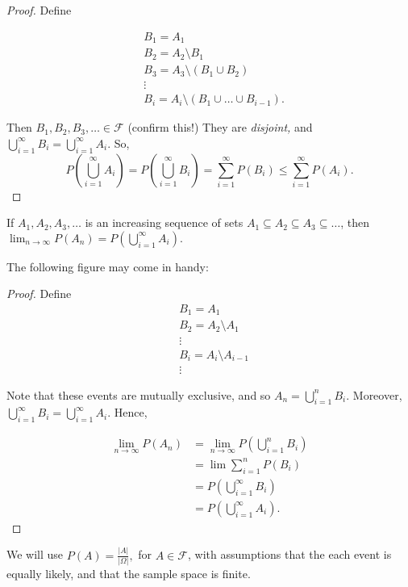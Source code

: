 \begin{proof}
Define 

\begin{align*}
    &B_1=A_1\\
    &B_2= A_2\setminus B_1 \\
    &B_3= A_3 \setminus (B_1\cup B_2) \\
    &\vdots \\
    &B_i=A_i\setminus(B_1\cup \dots \cup B_{i-1}).
\end{align*}

    Then $B_1,B_2,B_3,\dots\in \mathcal F$ (confirm this!) They are \textit{disjoint,} and $\bigcup_{i=1}^\infty B_i=\bigcup^\infty_{i=1}A_i.$ So,
    $$P\left(\bigcup_{i=1}^\infty A_i\right)=P\left(\bigcup_{i=1}^\infty B_i\right)=\sum^\infty_{i=1}P(B_i)\leq \sum^\infty_{i=1}P(A_i).
    $$
\end{proof}
\begin{prop}
		
If $A_1,A_2,A_3,\dots$ is an increasing sequence of sets $A_1\subseteq A_2\subseteq A_3\subseteq \dots$, then $\lim_{n\to \infty} P(A_n)=P\left(\bigcup_{i=1}^\infty A_i\right).$ 
\end{prop}
The following figure may come in handy:
\begin{proof}
Define
\begin{align*}
    &B_1=A_1 \\
    &B_2=A_2\setminus A_1 \\
    &\vdots \\
    &B_i=A_i\setminus A_{i-1}\\
    &\vdots 
\end{align*}


Note that these events are mutually exclusive, and so $A_n=\bigcup^n_{i=1} B_i$. Moreover, $\bigcup_{i=1}^\infty B_i=\bigcup^\infty_{i=1}A_i$. Hence,

\begin{align*}
    \lim_{n\to \infty}P(A_n)&=
    \lim_{n\to \infty}P\left(\bigcup^n_{i=1} B_i\right) \\
    &=\lim \sum^n_{i=1}P(B_i) \\
    &= P\left(\bigcup^\infty_{i=1}B_i\right) \\
    &  = P\left(\bigcup^\infty_{i=1}A_i\right).
\end{align*}
\end{proof}
We will use $P(A)=\frac{|A|}{|\Omega|},$ for $A\in \mathcal F$, with assumptions that the each event is equally likely, and that the sample space is finite.

